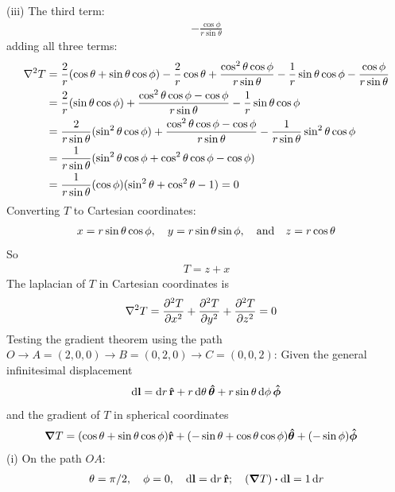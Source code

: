 \documentclass[../main.tex]{subfiles}
\begin{document}
(iii) The third term:
\begin{align*}
    -\frac{\cos\phi}{r \sin\theta} 
\end{align*}
adding all three terms:
\begin{align*}
    \laplacian{T} &= \frac{2}{r} (\cos\theta + \sin\theta \cos\phi)
        - \frac{2}{r} \cos\theta + \frac{\cos^2\theta \cos\phi }{r \sin\theta}
        - \frac{1}{r} \sin\theta \cos\phi -\frac{\cos\phi}{r \sin\theta} \\
    &= \frac{2}{r} (\sin\theta \cos\phi)
        + \frac{\cos^2\theta \cos\phi - \cos\phi}{r \sin\theta}
        - \frac{1}{r} \sin\theta \cos\phi \\
    &= \frac{2}{r \sin\theta} (\sin^2\theta \cos\phi)
        + \frac{\cos^2\theta \cos\phi - \cos\phi}{r \sin\theta}
        - \frac{1}{r \sin\theta} \sin^2\theta \cos\phi \\
    &= \frac{1}{r \sin\theta} (\sin^2\theta \cos\phi + \cos^2\theta \cos\phi - \cos\phi) \\
    &= \frac{1}{r \sin\theta} (\cos\phi)(\sin^2\theta + \cos^2\theta - 1) = 0
\end{align*}
Converting $T$ to Cartesian coordinates:
\begin{align*}
    x = r \sin\theta \cos\phi, \quad y = r \sin\theta \sin\phi, \qand z = r \cos\theta
\end{align*}
So
\begin{align*}
    T = z + x
\end{align*}
The laplacian of $T$ in Cartesian coordinates is
\begin{align*}
    \laplacian{T} &= \pdv[2]{T}{x} + \pdv[2]{T}{y} + \pdv[2]{T}{z} = 0
\end{align*}
Testing the gradient theorem using the path $O \to A = (2,0,0) \to B = (0,2,0) \to C = (0,0,2)$:
Given the general infinitesimal displacement
\begin{align*}
    \dd{\vb{l}} = \dd{r} \vu{r} + r \dd{\theta} \vu*{\theta} + r \sin\theta \dd{\phi} \vu*{\phi}
\end{align*}
and the gradient of $T$ in spherical coordinates
\begin{align*}
    \grad{T} &= (\cos\theta + \sin\theta \cos\phi) \vu{r}
        +  (-\sin\theta + \cos\theta \cos\phi) \vu*{\theta}
        + (-\sin\phi) \vu*{\phi}
\end{align*}
(i) On the path $OA$:
\begin{align*}
    \theta = \pi/2, \quad \phi = 0, \quad \dd{\vb{l}} = \dd{r} \vu{r}; \quad
    (\grad{T}) \vdot \dd{\vb{l}} = 1 \dd{r}
\end{align*}
\end{document}
